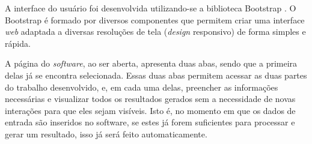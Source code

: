 \documentclass[12pt]{article}
\begin{document}
A interface do usuário foi desenvolvida utilizando-se a biblioteca Bootstrap \cite{bootstrap}. O Bootstrap é formado
por diversos componentes que permitem criar uma interface \textit{web} adaptada a diversas resoluções de tela
(\textit{design} responsivo) de forma simples e rápida.

A página do \textit{software}, ao ser aberta, apresenta duas abas, sendo que a primeira delas já se encontra selecionada.
Essas duas abas permitem acessar as duas partes do trabalho desenvolvido, e, em cada uma delas, preencher as informações
necessárias e visualizar todos os resultados gerados sem a necessidade de novas interações para que eles sejam visíveis.
Isto é, no momento em que os dados de entrada são inseridos no software, se estes já forem suficientes para processar e
gerar um resultado, isso já será feito automaticamente.





\end{document}
